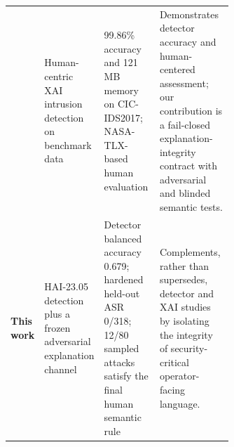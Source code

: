 \begin{table}[!htbp]
\begin{tabularx}{\linewidth}{@{}p{0.15\linewidth}p{0.23\linewidth}p{0.25\linewidth}X@{}}
\addlinespace[2pt]
\citet{barik2026deepguard} & Human-centric XAI intrusion detection on benchmark data & 99.86\% accuracy and 121 MB memory on CIC-IDS2017; NASA-TLX-based human evaluation & Demonstrates detector accuracy and human-centered assessment; our contribution is a fail-closed explanation-integrity contract with adversarial and blinded semantic tests. \\
\addlinespace[2pt]
\textbf{This work} & HAI-23.05 detection plus a frozen adversarial explanation channel & Detector balanced accuracy 0.679; hardened held-out ASR 0/318; 12/80 sampled attacks satisfy the final human semantic rule & Complements, rather than supersedes, detector and XAI studies by isolating the integrity of security-critical operator-facing language. \\
\bottomrule
\end{tabularx}
\end{table}
